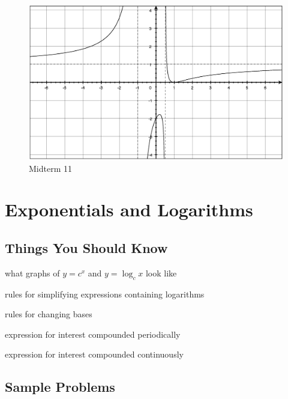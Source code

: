 \documentclass[fleqn,addpoints]{exam}
\begin{document}
\begin{description}
\begin{figure}[H]
  \centering
  \includegraphics[scale=.5]{midterm_11.eps}
  \caption*{Midterm 11}
\end{figure}

\end{description}

\section{Exponentials and Logarithms}
\subsection{Things You Should Know}
\begin{itemize*}
\item what graphs of $y=c^x$ and $y = \log_c x$ look like
\item rules for simplifying expressions containing logarithms
\item rules for changing bases
\item expression for interest compounded periodically
\item expression for interest compounded continuously
\end{itemize*}

\subsection{Sample Problems}
\end{document}
